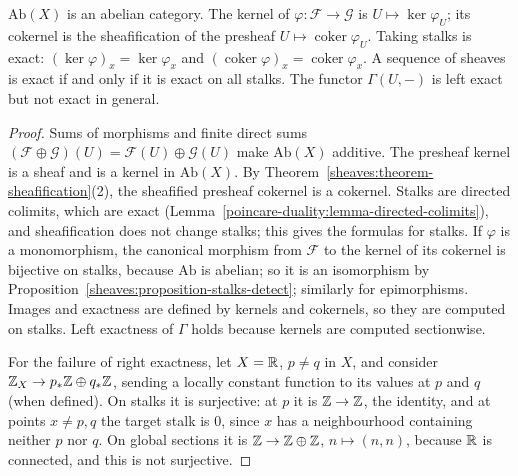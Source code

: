 \begin{proposition}\label{sheaves:proposition-abelian-category}
$\mathrm{Ab}(X)$ is an abelian category. The kernel of $\varphi \colon \mathcal{F} \to \mathcal{G}$ is $U \mapsto \ker\varphi_U$; its cokernel is the sheafification of the presheaf
$U \mapsto \operatorname{coker}\varphi_U$. Taking stalks is exact: $(\ker\varphi)_x = \ker\varphi_x$ and $(\operatorname{coker}\varphi)_x = \operatorname{coker}\varphi_x$. A sequence of sheaves is exact if
and only if it is exact on all stalks. The functor $\Gamma(U, -)$ is left exact but not exact in general.
\end{proposition}

\begin{proof}
Sums of morphisms and finite direct sums $(\mathcal{F} \oplus \mathcal{G})(U) = \mathcal{F}(U) \oplus \mathcal{G}(U)$ make $\mathrm{Ab}(X)$ additive. The presheaf kernel is a sheaf and is
a kernel in $\mathrm{Ab}(X)$. By Theorem~\ref{sheaves:theorem-sheafification}(2), the sheafified presheaf cokernel is a cokernel. Stalks are directed colimits, which are exact
(Lemma~\ref{poincare-duality:lemma-directed-colimits}), and sheafification does not change stalks; this gives the formulas for stalks. If $\varphi$ is a monomorphism, the
canonical morphism from $\mathcal{F}$ to the kernel of its cokernel is bijective on stalks, because $\mathrm{Ab}$ is abelian; so it is an isomorphism by
Proposition~\ref{sheaves:proposition-stalks-detect}; similarly for epimorphisms. Images and exactness are defined by kernels and cokernels, so they are computed on stalks. Left
exactness of $\Gamma$ holds because kernels are computed sectionwise.

For the failure of right exactness, let $X = \mathbb{R}$, $p \neq q$ in $X$, and consider $\mathbb{Z}_X \to p_*\mathbb{Z} \oplus q_*\mathbb{Z}$, sending a locally constant function to its values at $p$ and $q$ (when
defined). On stalks it is surjective: at $p$ it is $\mathbb{Z} \to \mathbb{Z}$, the identity, and at points $x \neq p, q$ the target stalk is $0$, since $x$ has a neighbourhood containing neither
$p$ nor $q$. On global sections it is $\mathbb{Z} \to \mathbb{Z} \oplus \mathbb{Z}$, $n \mapsto (n, n)$, because $\mathbb{R}$ is connected, and this is not surjective.
\end{proof}

